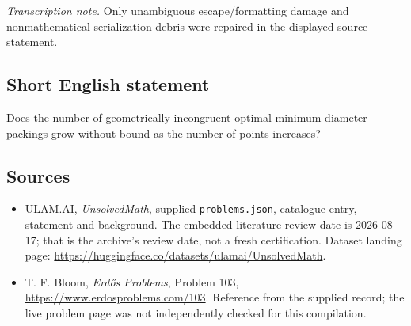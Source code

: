 \documentclass[11pt,a4paper]{article}
\begin{document}
{\small\emph{Transcription note.} Only unambiguous escape/formatting damage and nonmathematical serialization debris were repaired in the displayed source statement.}

\subsection{Short English statement}

Does the number of geometrically incongruent optimal minimum-diameter packings grow without bound as the number of points increases?

\subsection{Sources}

{\small

\begin{itemize}

\item[\hypertarget{source:statement:1}{S1}] ULAM.AI, \emph{UnsolvedMath}, supplied \texttt{problems.json}, catalogue entry, statement and background. The embedded literature-review date is 2026-08-17; that is the archive’s review date, not a fresh certification. Dataset landing page: \url{https://huggingface.co/datasets/ulamai/UnsolvedMath}.

\item[\hypertarget{source:statement:2}{S2}] T. F. Bloom, \emph{Erdős Problems}, Problem 103, \url{https://www.erdosproblems.com/103}. Reference from the supplied record; the live problem page was not independently checked for this compilation.

\end{itemize}

}

\label{end:statement}
\end{document}
